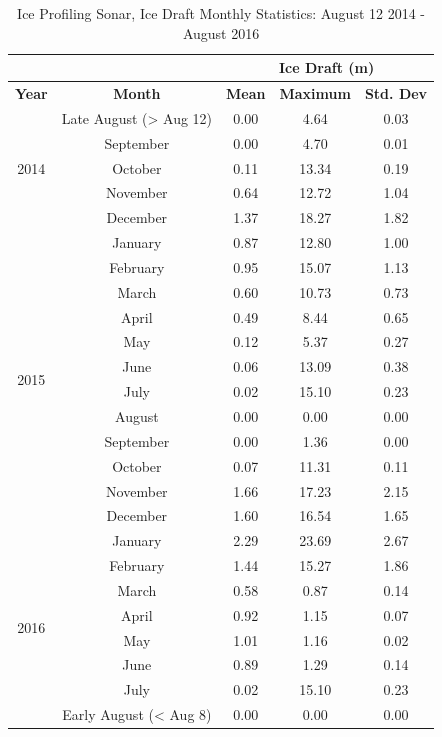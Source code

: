 \documentclass[12pt]{dforeport}
\begin{document}
\begin{table}[ht]
\centering
\caption[Ice Profiling Sonar, Ice Draft Monthly Statistics]{Ice Profiling Sonar, Ice Draft Monthly Statistics: August 12 2014 - August 2016} 
\label{t:ips_stats_2014_2016}
\begin{tabular}{c c | c c c}
& & \multicolumn{3}{c}{\textbf{Ice Draft (m)}} \\ 
    \hline
\textbf{Year} & \textbf{Month} & \textbf{Mean} & \textbf{Maximum} & \textbf{Std. Dev} \\ 
\hline
    \multicolumn{1}{c}{\multirow{5}{*}{2014}} & Late August (> Aug 12) & 0.00 & 4.64 & 0.03 \\
    \multicolumn{1}{c}{} & September & 0.00 & 4.70 & 0.01 \\
    \multicolumn{1}{c}{} & October & 0.11 & 13.34 & 0.19 \\
    \multicolumn{1}{c}{} & November & 0.64 & 12.72 & 1.04 \\
    \multicolumn{1}{c}{} & December & 1.37 & 18.27 & 1.82 \\
    \hline
    \multicolumn{1}{c}{\multirow{12}{*}{2015}} & January & 0.87 & 12.80 & 1.00 \\
    \multicolumn{1}{c}{} & February & 0.95 & 15.07 & 1.13 \\
    \multicolumn{1}{c}{} & March & 0.60 & 10.73 & 0.73 \\
    \multicolumn{1}{c}{} & April & 0.49 & 8.44 & 0.65 \\
    \multicolumn{1}{c}{} & May & 0.12 & 5.37 & 0.27 \\
    \multicolumn{1}{c}{} & June & 0.06 & 13.09 & 0.38 \\
    \multicolumn{1}{c}{} & July & 0.02 & 15.10 & 0.23\\
    \multicolumn{1}{c}{} & August & 0.00 & 0.00 & 0.00  \\
    \multicolumn{1}{c}{} & September & 0.00 & 1.36 & 0.00  \\
    \multicolumn{1}{c}{} & October & 0.07 & 11.31 & 0.11  \\
    \multicolumn{1}{c}{} & November & 1.66 & 17.23 & 2.15  \\
    \multicolumn{1}{c}{} & December & 1.60 & 16.54 & 1.65 \\
    \hline
    \multicolumn{1}{c}{\multirow{12}{*}{2016}} & January & 2.29 & 23.69 & 2.67  \\
    \multicolumn{1}{c}{} & February & 1.44 & 15.27 & 1.86  \\
    \multicolumn{1}{c}{} & March & 0.58 & 0.87 & 0.14  \\
    \multicolumn{1}{c}{} & April & 0.92 & 1.15 & 0.07  \\
    \multicolumn{1}{c}{} & May & 1.01 & 1.16 & 0.02  \\
    \multicolumn{1}{c}{} & June & 0.89 & 1.29 & 0.14  \\
    \multicolumn{1}{c}{} & July & 0.02 & 15.10 & 0.23 \\
    \multicolumn{1}{c}{} & Early August (< Aug 8) & 0.00 & 0.00 & 0.00\\
    \hline
\end{tabular}
\end{table}
\end{document}
